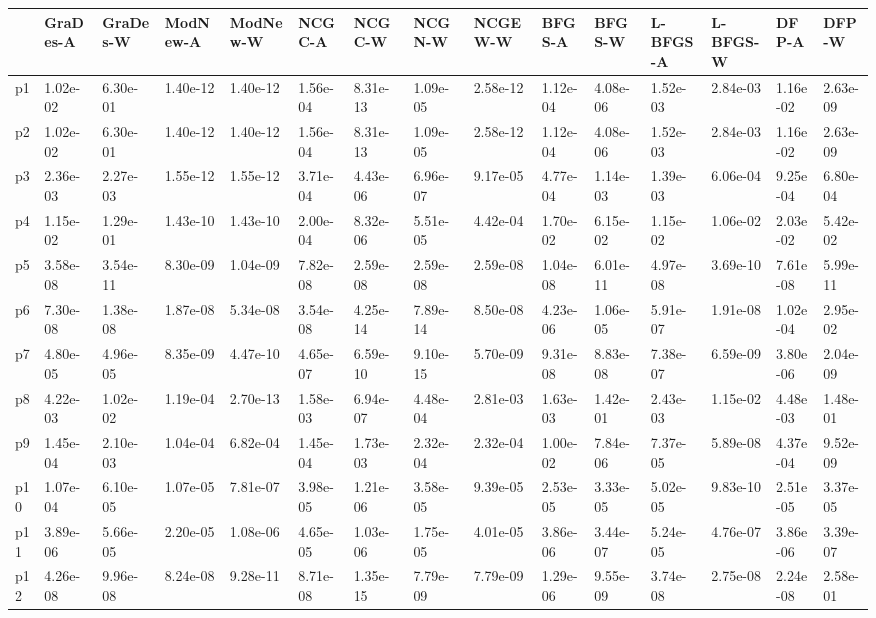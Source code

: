 \begin{tabular}{lllllllllllllll}
\toprule
{} & GraDes-A  & GraDes-W  & ModNew-A  & ModNew-W  &   NCGC-A  &   NCGC-W  &   NCGN-W  &  NCGEW-W  &   BFGS-A  &   BFGS-W  & L-BFGS-A  & L-BFGS-W  &    DFP-A  &    DFP-W  \\
\midrule
p1  &  1.02e-02 &  6.30e-01 &  1.40e-12 &  1.40e-12 &  1.56e-04 &  8.31e-13 &  1.09e-05 &  2.58e-12 &  1.12e-04 &  4.08e-06 &  1.52e-03 &  2.84e-03 &  1.16e-02 &  2.63e-09 \\
p2  &  1.02e-02 &  6.30e-01 &  1.40e-12 &  1.40e-12 &  1.56e-04 &  8.31e-13 &  1.09e-05 &  2.58e-12 &  1.12e-04 &  4.08e-06 &  1.52e-03 &  2.84e-03 &  1.16e-02 &  2.63e-09 \\
p3  &  2.36e-03 &  2.27e-03 &  1.55e-12 &  1.55e-12 &  3.71e-04 &  4.43e-06 &  6.96e-07 &  9.17e-05 &  4.77e-04 &  1.14e-03 &  1.39e-03 &  6.06e-04 &  9.25e-04 &  6.80e-04 \\
p4  &  1.15e-02 &  1.29e-01 &  1.43e-10 &  1.43e-10 &  2.00e-04 &  8.32e-06 &  5.51e-05 &  4.42e-04 &  1.70e-02 &  6.15e-02 &  1.15e-02 &  1.06e-02 &  2.03e-02 &  5.42e-02 \\
p5  &  3.58e-08 &  3.54e-11 &  8.30e-09 &  1.04e-09 &  7.82e-08 &  2.59e-08 &  2.59e-08 &  2.59e-08 &  1.04e-08 &  6.01e-11 &  4.97e-08 &  3.69e-10 &  7.61e-08 &  5.99e-11 \\
p6  &  7.30e-08 &  1.38e-08 &  1.87e-08 &  5.34e-08 &  3.54e-08 &  4.25e-14 &  7.89e-14 &  8.50e-08 &  4.23e-06 &  1.06e-05 &  5.91e-07 &  1.91e-08 &  1.02e-04 &  2.95e-02 \\
p7  &  4.80e-05 &  4.96e-05 &  8.35e-09 &  4.47e-10 &  4.65e-07 &  6.59e-10 &  9.10e-15 &  5.70e-09 &  9.31e-08 &  8.83e-08 &  7.38e-07 &  6.59e-09 &  3.80e-06 &  2.04e-09 \\
p8  &  4.22e-03 &  1.02e-02 &  1.19e-04 &  2.70e-13 &  1.58e-03 &  6.94e-07 &  4.48e-04 &  2.81e-03 &  1.63e-03 &  1.42e-01 &  2.43e-03 &  1.15e-02 &  4.48e-03 &  1.48e-01 \\
p9  &  1.45e-04 &  2.10e-03 &  1.04e-04 &  6.82e-04 &  1.45e-04 &  1.73e-03 &  2.32e-04 &  2.32e-04 &  1.00e-02 &  7.84e-06 &  7.37e-05 &  5.89e-08 &  4.37e-04 &  9.52e-09 \\
p10 &  1.07e-04 &  6.10e-05 &  1.07e-05 &  7.81e-07 &  3.98e-05 &  1.21e-06 &  3.58e-05 &  9.39e-05 &  2.53e-05 &  3.33e-05 &  5.02e-05 &  9.83e-10 &  2.51e-05 &  3.37e-05 \\
p11 &  3.89e-06 &  5.66e-05 &  2.20e-05 &  1.08e-06 &  4.65e-05 &  1.03e-06 &  1.75e-05 &  4.01e-05 &  3.86e-06 &  3.44e-07 &  5.24e-05 &  4.76e-07 &  3.86e-06 &  3.39e-07 \\
p12 &  4.26e-08 &  9.96e-08 &  8.24e-08 &  9.28e-11 &  8.71e-08 &  1.35e-15 &  7.79e-09 &  7.79e-09 &  1.29e-06 &  9.55e-09 &  3.74e-08 &  2.75e-08 &  2.24e-08 &  2.58e-01 \\
\bottomrule
\end{tabular}
